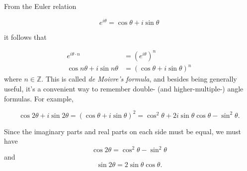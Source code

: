 \documentclass{article}
\begin{document}
From the Euler relation

\begin{equation*}
e^{i\theta} = \cos \theta + i \sin \theta
\end{equation*}

it follows that

\begin{align*}
e^{i\theta \cdot n} &= (e^{i\theta})^n\\
\cos n \theta + i \sin n \theta &= (\cos \theta + i \sin \theta)^n
\end{align*}
where $n\in\mathbb{Z}$.
This is called \emph{de Moivre's formula}, and besides being generally useful, it's a convenient way to remember double- (and higher-multiple-) angle formulas.  For example,

\begin{equation*}
\cos 2 \theta + i \sin 2 \theta = (\cos \theta + i \sin \theta)^2 = \cos^2 \theta + 2 i \sin \theta \cos \theta - \sin^2 \theta.
\end{equation*}

Since the imaginary parts and real parts on each side must be equal, we must have
\begin{equation*}
\cos 2 \theta = \cos^2 \theta - \sin^2 \theta
\end{equation*}
and
\begin{equation*}
\sin 2 \theta = 2 \sin \theta \cos \theta.
\end{equation*}
\end{document}
